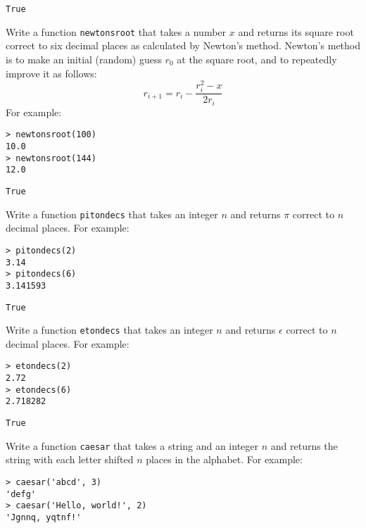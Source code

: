 \documentclass[a4paper, 12pt]{exam}
\begin{document}
\begin{questions}
\begin{solution}
  \begin{verbatim}
True
  \end{verbatim}
\end{solution}


\question
Write a function \texttt{newtonsroot} that takes a number \( x \) and returns its square root correct to six decimal places as calculated by Newton's method.
Newton's method is to make an initial (random) guess \( r_0 \) at the square root, and to repeatedly improve it as follows:
\[ r_{i+1} = r_i - \frac{r_i^2 - x}{2 r_i} \]
For example:
\begin{verbatim}
> newtonsroot(100)
10.0
> newtonsroot(144)
12.0
\end{verbatim}

\begin{solution}
  \begin{verbatim}
True
  \end{verbatim}
\end{solution}


\question
Write a function \texttt{pitondecs} that takes an integer \( n \) and returns \( \pi \) correct to \( n \) decimal places.
For example:
\begin{verbatim}
> pitondecs(2)
3.14
> pitondecs(6)
3.141593
\end{verbatim}

\begin{solution}
  \begin{verbatim}
True
  \end{verbatim}
\end{solution}


\question
Write a function \texttt{etondecs} that takes an integer \( n \) and returns \( \epsilon \) correct to \( n \) decimal places.
For example:
\begin{verbatim}
> etondecs(2)
2.72
> etondecs(6)
2.718282
\end{verbatim}

\begin{solution}
  \begin{verbatim}
True
  \end{verbatim}
\end{solution}

\question
Write a function \texttt{caesar} that takes a string and an integer $n$ and returns the string with each letter shifted $n$ places in the alphabet.
For example:
\begin{verbatim}
> caesar('abcd', 3)
'defg'
> caesar('Hello, world!', 2)
'Jgnnq, yqtnf!'
\end{verbatim}



\end{questions}
\end{document}
